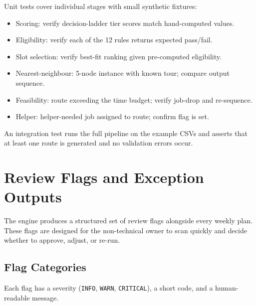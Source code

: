 \documentclass[12pt]{article}
\begin{document}
Unit tests cover individual stages with small synthetic fixtures:
\begin{itemize}
    \item Scoring: verify decision-ladder tier scores match hand-computed values.
    \item Eligibility: verify each of the 12 rules returns expected pass/fail.
    \item Slot selection: verify best-fit ranking given pre-computed eligibility.
    \item Nearest-neighbour: 5-node instance with known tour; compare output sequence.
    \item Feasibility: route exceeding the time budget; verify job-drop and re-sequence.
    \item Helper: helper-needed job assigned to route; confirm flag is set.
\end{itemize}

An integration test runs the full pipeline on the example CSVs and asserts that at least one route is generated and no validation errors occur.

\section*{Review Flags and Exception Outputs}
\label{sec:flags}

The engine produces a structured set of review flags alongside every weekly plan.
These flags are designed for the non-technical owner to scan quickly and decide whether to approve, adjust, or re-run.

\subsection*{Flag Categories}

Each flag has a severity (\texttt{INFO}, \texttt{WARN}, \texttt{CRITICAL}), a short code, and a human-readable message.
\end{document}
